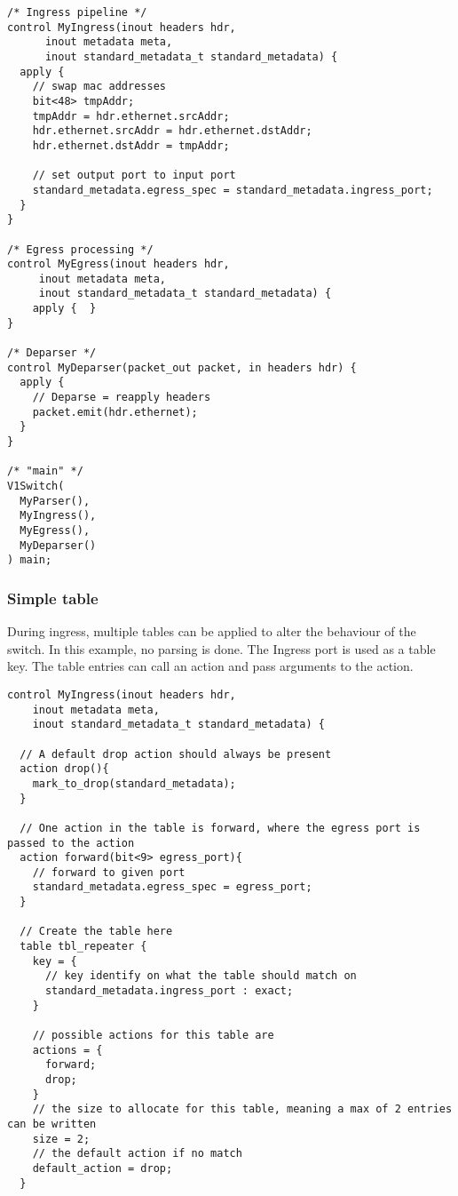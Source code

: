 \documentclass[a4paper, fontsize=8pt, landscape, DIV=1]{scrartcl}
\begin{document}
\begin{multicols*}{3}
\begin{lstlisting}[style=P4style]
/* Ingress pipeline */
control MyIngress(inout headers hdr,
      inout metadata meta,
      inout standard_metadata_t standard_metadata) {
  apply {
    // swap mac addresses
    bit<48> tmpAddr;
    tmpAddr = hdr.ethernet.srcAddr;
    hdr.ethernet.srcAddr = hdr.ethernet.dstAddr;
    hdr.ethernet.dstAddr = tmpAddr;

    // set output port to input port
    standard_metadata.egress_spec = standard_metadata.ingress_port;
  }
}

/* Egress processing */
control MyEgress(inout headers hdr,
     inout metadata meta,
     inout standard_metadata_t standard_metadata) {
    apply {  }
}

/* Deparser */
control MyDeparser(packet_out packet, in headers hdr) {
  apply {
    // Deparse = reapply headers
    packet.emit(hdr.ethernet);
  }
}

/* "main" */
V1Switch(
  MyParser(),
  MyIngress(),
  MyEgress(),
  MyDeparser()
) main;\end{lstlisting}


  \subsubsection{Simple table}
  During ingress, multiple tables can be applied to alter the behaviour of the switch. In this example, no parsing is done. The Ingress port is used as a table key. The table entries can call an action and pass arguments to the action.

  \begin{lstlisting}[style=P4style]
control MyIngress(inout headers hdr,
    inout metadata meta,
    inout standard_metadata_t standard_metadata) {

  // A default drop action should always be present
  action drop(){
    mark_to_drop(standard_metadata);
  }
  
  // One action in the table is forward, where the egress port is passed to the action
  action forward(bit<9> egress_port){
    // forward to given port
    standard_metadata.egress_spec = egress_port;
  }

  // Create the table here
  table tbl_repeater {
    key = {
      // key identify on what the table should match on
      standard_metadata.ingress_port : exact;
    }

    // possible actions for this table are
    actions = {
      forward;
      drop;
    }
    // the size to allocate for this table, meaning a max of 2 entries can be written
    size = 2;
    // the default action if no match
    default_action = drop;
  }


\end{lstlisting}
\end{multicols*}
\end{document}
